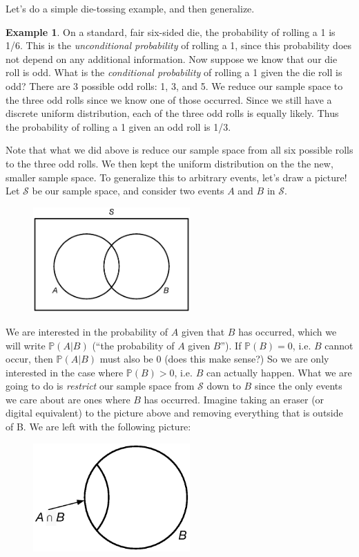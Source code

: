 \documentclass[12pt]{article}
\theoremstyle{definition}
\newtheorem*{example}{Example}
\theoremstyle{remark}
\def\P{{\mathbb P}}
\def\cals{{\mathcal S}}
\begin{document}
Let's do a simple die-tossing example, and then generalize.

\begin{example}On a standard, fair six-sided die, the probability of rolling a 1 is 1/6. This is the \emph{unconditional probability} of rolling a 1, since this probability does not depend on any additional information. Now suppose we know that our die roll is odd. What is the \emph{conditional probability} of rolling a 1 given the die roll is odd? There are 3 possible odd rolls: 1, 3, and 5. We reduce our sample space to the three odd rolls since we know one of those occurred. Since we still have a discrete uniform distribution, each of the three odd rolls is equally likely. Thus the probability of rolling a 1 given an odd roll is 1/3.
\end{example}

Note that what we did above is reduce our sample space from all six possible rolls to the three odd rolls. We then kept the uniform distribution on the the new, smaller sample space. To generalize this to arbitrary events, let's draw a picture! Let $\cals$ be our sample space, and consider two events $A$ and $B$ in $\cals$. 

\begin{figure}[H]
\centering
\includegraphics[width=6cm]{venn.eps}
\end{figure}

We are interested in the probability of $A$ given that $B$ has occurred, which we will write $\P(A|B)$ (``the probability of $A$ given $B$''). If $\P(B) = 0$, i.e. $B$ cannot occur, then $\P(A|B)$ must also be 0 (does this make sense?) So we are only interested in the case where $\P(B) > 0$, i.e. $B$ can actually happen. What we are going to do is \emph{restrict} our sample space from $\cals$ down to $B$ since the only events we care about are ones where $B$ has occurred. Imagine taking an eraser (or digital equivalent) to the picture above and removing everything that is outside of B. We are left with the following picture:

\begin{figure}[H]
\centering
\includegraphics[width=6cm]{AgivenB.eps}
\end{figure}
\end{document}

